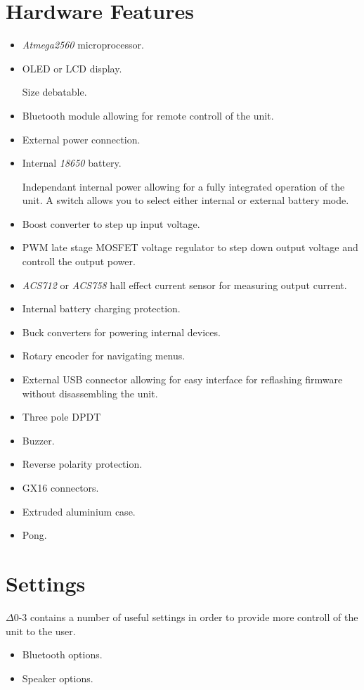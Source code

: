 \documentclass{article}
\begin{document}
\section{Hardware Features}
\begin{itemize}
	\item \textit{Atmega2560} microprocessor.
	\item OLED or LCD display.
	
	Size debatable.
	\item Bluetooth module allowing for remote controll of the unit.
	\item External power connection.
	\item Internal \textit{18650} battery.
	
	Independant internal power allowing for a fully integrated operation of the unit. A switch allows you to select either internal or external 	battery mode.
	\item Boost converter to step up input voltage.
	\item PWM late stage MOSFET voltage regulator to step down output voltage and controll the output power.
	\item \textit{ACS712} or \textit{ACS758} hall effect current sensor for measuring output current.
	\item Internal battery charging protection.
	\item Buck converters for powering internal devices.
	\item Rotary encoder for navigating menus.
	\item External USB connector allowing for easy interface for reflashing firmware without disassembling the unit.
	\item Three pole DPDT
	\item Buzzer.
	\item Reverse polarity protection.
	\item GX16 connectors.
	\item Extruded aluminium case.
	\item Pong.
\end{itemize}

\section{Settings}
$\Delta$0-3 contains a number of useful settings in order to provide more controll of the unit to the user.

\begin{itemize}
	\item Bluetooth options.
	\item Speaker options.
\end{itemize}
\end{document}

